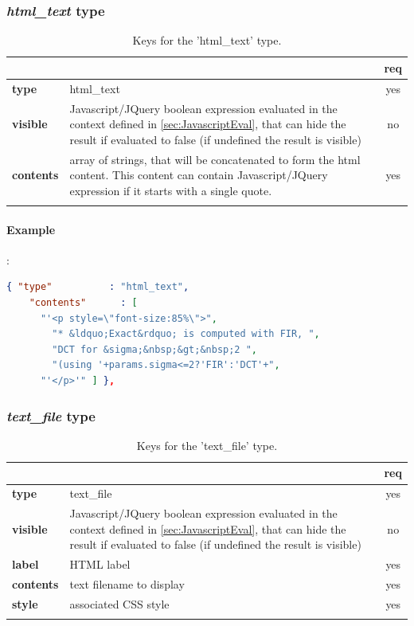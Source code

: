 \subsubsection{ \emph{html\_text} type}

\begin{longtable}{|>{\bf}L{\linewidth}|L{\linewidth}|c|}
\hline
{}     &  & {\bf req} \tabularnewline 
\hline \hline
 type      & html\_text  & yes \\ \hline
 visible   & Javascript/JQuery boolean expression evaluated in the context 
             defined in \ref{sec:JavascriptEval}, that can hide the result if
             evaluated to false (if undefined the result is visible)& no \\ \hline
 contents  & array of strings, that will be concatenated to form the html 
             content. This content can contain Javascript/JQuery expression if it starts
            with a single quote. & yes \\ \hline
\caption{Keys for the 'html\_text' type.}
\end{longtable}

\paragraph{Example}:\\
\begin{lstlisting}[language=json,firstnumber=1]
  { "type"          : "html_text", 
    "contents"      : [
      "'<p style=\"font-size:85%\">",
        "* &ldquo;Exact&rdquo; is computed with FIR, ",
        "DCT for &sigma;&nbsp;&gt;&nbsp;2 ",
        "(using '+params.sigma<=2?'FIR':'DCT'+",
      "'</p>'" ] },
\end{lstlisting}


\subsubsection{ \emph{text\_file} type}

\begin{longtable}{|>{\bf}L{\linewidth}|L{\linewidth}|c|}
\hline
{}     &  & {\bf req} \tabularnewline 
\hline \hline
 type      & text\_file  & yes \\ \hline
 visible   & Javascript/JQuery boolean expression evaluated in the context 
              defined in \ref{sec:JavascriptEval}, that can hide the result if
             evaluated to false (if undefined the result is visible)& no \\ \hline
 label     & HTML label & yes \\ \hline
 contents  & text filename to display & yes \\ \hline
 style     & associated CSS style & yes \\ \hline
\caption{Keys for the 'text\_file' type.}
\end{longtable}

